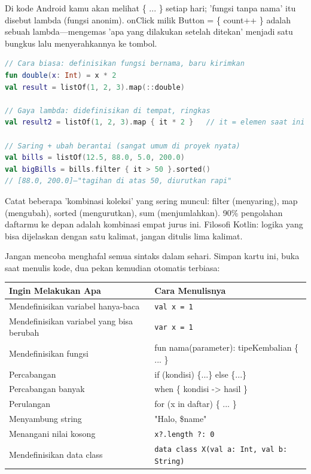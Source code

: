 
Di kode Android kamu akan melihat \{ ... \} setiap hari; 'fungsi tanpa nama' itu disebut lambda (fungsi anonim). onClick milik Button = \{ count++ \} adalah sebuah lambda—mengemas 'apa yang dilakukan setelah ditekan' menjadi satu bungkus lalu menyerahkannya ke tombol.

\begin{lstlisting}[language=Kotlin]
// Cara biasa: definisikan fungsi bernama, baru kirimkan
fun double(x: Int) = x * 2
val result = listOf(1, 2, 3).map(::double)

// Gaya lambda: didefinisikan di tempat, ringkas
val result2 = listOf(1, 2, 3).map { it * 2 }   // it = elemen saat ini

// Saring + ubah berantai (sangat umum di proyek nyata)
val bills = listOf(12.5, 88.0, 5.0, 200.0)
val bigBills = bills.filter { it > 50 }.sorted()
// [88.0, 200.0]—"tagihan di atas 50, diurutkan rapi"
\end{lstlisting}

Catat beberapa 'kombinasi koleksi' yang sering muncul: filter (menyaring), map (mengubah), sorted (mengurutkan), sum (menjumlahkan). 90\% pengolahan daftarmu ke depan adalah kombinasi empat jurus ini. Filosofi Kotlin: logika yang bisa dijelaskan dengan satu kalimat, jangan ditulis lima kalimat.


Jangan mencoba menghafal semua sintaks dalam sehari. Simpan kartu ini, buka saat menulis kode, dua pekan kemudian otomatis terbiasa:

\begin{center}
\begin{tabularx}{\linewidth}{|X|X|}
\hline
\textbf{Ingin Melakukan Apa} & \textbf{Cara Menulisnya} \tabularnewline
\hline
Mendefinisikan variabel hanya-baca & \texttt{val x = 1} \tabularnewline
Mendefinisikan variabel yang bisa berubah & \texttt{var x = 1} \tabularnewline
Mendefinisikan fungsi & fun nama(parameter): tipeKembalian \{ ... \} \tabularnewline
Percabangan & if (kondisi) \{...\} else \{...\} \tabularnewline
Percabangan banyak & when \{ kondisi -> hasil \} \tabularnewline
Perulangan & for (x in daftar) \{ ... \} \tabularnewline
Menyambung string & "Halo, \$name" \tabularnewline
Menangani nilai kosong & \texttt{x?.\allowbreak length ?: 0} \tabularnewline
Mendefinisikan data class & \texttt{data class X(val a: Int, val b: String)} \tabularnewline
\hline
\end{tabularx}
\end{center}

